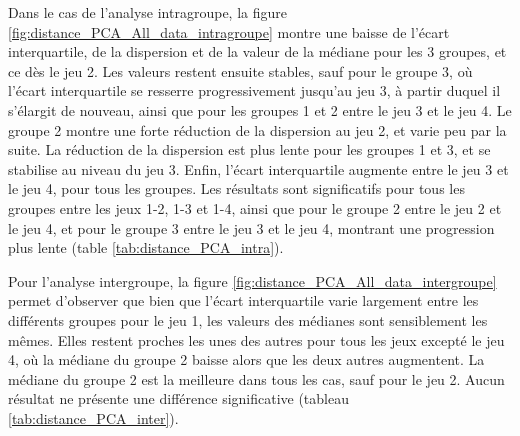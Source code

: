 Dans le cas de l'analyse intragroupe, la figure \ref{fig:distance_PCA_All_data_intragroupe} montre une baisse de l'écart interquartile, de la dispersion et de la valeur de la médiane pour les 3 groupes, et ce dès le jeu 2. Les valeurs restent ensuite stables, sauf pour le groupe 3, où l'écart interquartile se resserre progressivement jusqu'au jeu 3, à partir duquel il s'élargit de nouveau, ainsi que pour les groupes 1 et 2 entre le jeu 3 et le jeu 4. Le groupe 2 montre une forte réduction de la dispersion au jeu 2, et varie peu par la suite. La réduction de la dispersion est plus lente pour les groupes 1 et 3, et se stabilise au niveau du jeu 3. Enfin, l'écart interquartile augmente entre le jeu 3 et le jeu 4, pour tous les groupes. Les résultats sont significatifs pour tous les groupes entre les jeux 1-2, 1-3 et 1-4, ainsi que pour le groupe 2 entre le jeu 2 et le jeu 4, et pour le groupe 3 entre le jeu 3 et le jeu 4, montrant une progression plus lente (table \ref{tab:distance_PCA_intra}).

Pour l'analyse intergroupe, la figure \ref{fig:distance_PCA_All_data_intergroupe} permet d'observer que bien que l'écart interquartile varie largement entre les différents groupes pour le jeu 1, les valeurs des médianes sont sensiblement les mêmes. Elles restent proches les unes des autres pour tous les jeux excepté le jeu 4, où la médiane du groupe 2 baisse alors que les deux autres augmentent. La médiane du groupe 2 est la meilleure dans tous les cas, sauf pour le jeu 2. Aucun résultat ne présente une différence significative (tableau \ref{tab:distance_PCA_inter}).

